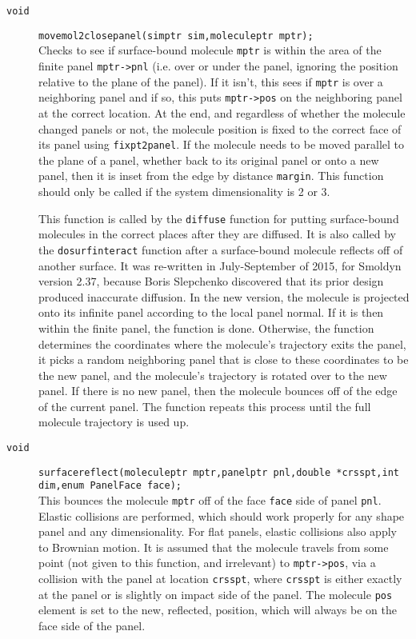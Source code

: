 \documentclass {scrbook}
\newcommand {\ttt} {\texttt}
\begin{document}
\begin{description}
\item[\ttt{void}]
\ttt{movemol2closepanel(simptr sim,moleculeptr mptr);}
\hfill \\
Checks to see if surface-bound molecule \ttt{mptr} is within the area of the finite panel \ttt{mptr->pnl} (i.e. over or under the panel, ignoring the position relative to the plane of the panel). If it isn't, this sees if \ttt{mptr} is over a neighboring panel and if so, this puts \ttt{mptr->pos} on the neighboring panel at the correct location. At the end, and regardless of whether the molecule changed panels or not, the molecule position is fixed to the correct face of its panel using \ttt{fixpt2panel}. If the molecule needs to be moved parallel to the plane of a panel, whether back to its original panel or onto a new panel, then it is inset from the edge by distance \ttt{margin}. This function should only be called if the system dimensionality is 2 or 3.

This function is called by the \ttt{diffuse} function for putting surface-bound molecules in the correct places after they are diffused. It is also called by the \ttt{dosurfinteract} function after a surface-bound molecule reflects off of another surface. It was re-written in July-September of 2015, for Smoldyn version 2.37, because Boris Slepchenko discovered that its prior design produced inaccurate diffusion. In the new version, the molecule is projected onto its infinite panel according to the local panel normal. If it is then within the finite panel, the function is done. Otherwise, the function determines the coordinates where the molecule's trajectory exits the panel, it picks a random neighboring panel that is close to these coordinates to be the new panel, and the molecule's trajectory is rotated over to the new panel. If there is no new panel, then the molecule bounces off of the edge of the current panel. The function repeats this process until the full molecule trajectory is used up.

\item[\ttt{void}]
\ttt{surfacereflect(moleculeptr mptr,panelptr pnl,double *crsspt,int dim,enum PanelFace face);}
\hfill \\
This bounces the molecule \ttt{mptr} off of the face \ttt{face} side of panel \ttt{pnl}. Elastic collisions are performed, which should work properly for any shape panel and any dimensionality. For flat panels, elastic collisions also apply to Brownian motion. It is assumed that the molecule travels from some point (not given to this function, and irrelevant) to \ttt{mptr->pos}, via a collision with the panel at location \ttt{crsspt}, where \ttt{crsspt} is either exactly at the panel or is slightly on impact side of the panel. The molecule \ttt{pos} element is set to the new, reflected, position, which will always be on the face side of the panel.


\end{description}
\end{document}
